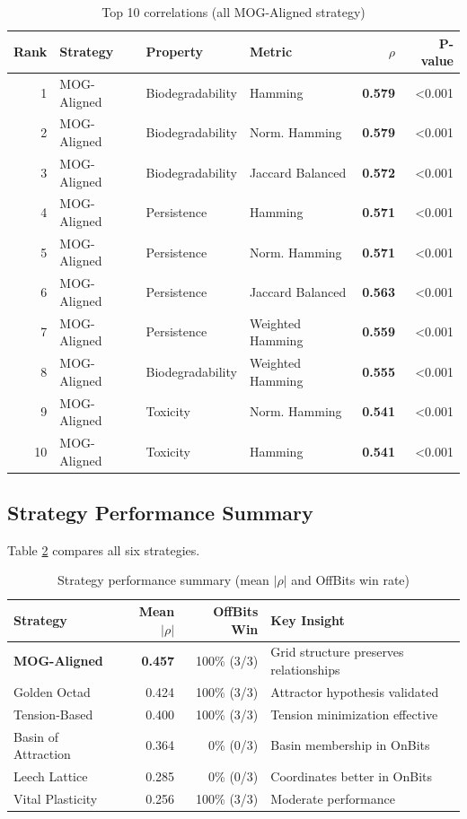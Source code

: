 \documentclass[11pt,letterpaper]{article}
\begin{document}
\begin{table}[H]
\centering
\caption{Top 10 correlations (all MOG-Aligned strategy)}
\label{tab:top10}
\small
\begin{tabular}{rlllrr}
\toprule
\textbf{Rank} & \textbf{Strategy} & \textbf{Property} & \textbf{Metric} & \textbf{$\rho$} & \textbf{P-value} \\
\midrule
1 & MOG-Aligned & Biodegradability & Hamming & \textbf{0.579} & <0.001 \\
2 & MOG-Aligned & Biodegradability & Norm. Hamming & \textbf{0.579} & <0.001 \\
3 & MOG-Aligned & Biodegradability & Jaccard Balanced & \textbf{0.572} & <0.001 \\
4 & MOG-Aligned & Persistence & Hamming & \textbf{0.571} & <0.001 \\
5 & MOG-Aligned & Persistence & Norm. Hamming & \textbf{0.571} & <0.001 \\
6 & MOG-Aligned & Persistence & Jaccard Balanced & \textbf{0.563} & <0.001 \\
7 & MOG-Aligned & Persistence & Weighted Hamming & \textbf{0.559} & <0.001 \\
8 & MOG-Aligned & Biodegradability & Weighted Hamming & \textbf{0.555} & <0.001 \\
9 & MOG-Aligned & Toxicity & Norm. Hamming & \textbf{0.541} & <0.001 \\
10 & MOG-Aligned & Toxicity & Hamming & \textbf{0.541} & <0.001 \\
\bottomrule
\end{tabular}
\end{table}

\subsection{Strategy Performance Summary}

Table \ref{tab:strategy_summary} compares all six strategies.

\begin{table}[H]
\centering
\caption{Strategy performance summary (mean $|\rho|$ and OffBits win rate)}
\label{tab:strategy_summary}
\begin{tabular}{lrrl}
\toprule
\textbf{Strategy} & \textbf{Mean $|\rho|$} & \textbf{OffBits Win} & \textbf{Key Insight} \\
\midrule
\textbf{MOG-Aligned} & \textbf{0.457} & 100\% (3/3) & Grid structure preserves relationships \\
Golden Octad & 0.424 & 100\% (3/3) & Attractor hypothesis validated \\
Tension-Based & 0.400 & 100\% (3/3) & Tension minimization effective \\
Basin of Attraction & 0.364 & 0\% (0/3) & Basin membership in OnBits \\
Leech Lattice & 0.285 & 0\% (0/3) & Coordinates better in OnBits \\
Vital Plasticity & 0.256 & 100\% (3/3) & Moderate performance \\
\bottomrule
\end{tabular}
\end{table}
\end{document}
